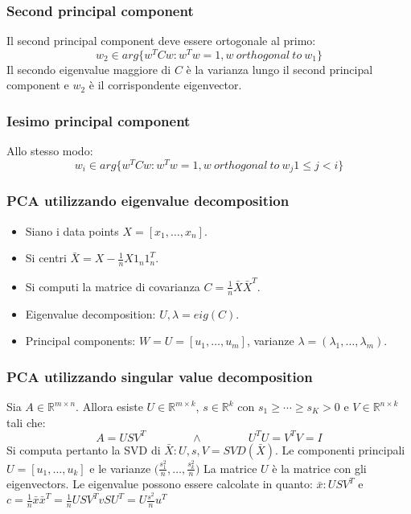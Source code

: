 		\subsubsection{Second principal component}
		Il second principal component deve essere ortogonale al primo:
		$$w_2\in arg\{w^TCw:w^Tw=1,w\ orthogonal\ to\ w_1\}$$
		Il secondo eigenvalue maggiore di $C$ \`e la varianza lungo il second principal component e $w_2$ \`e il corrispondente eigenvector.

		\subsubsection{Iesimo principal component}
		Allo stesso modo:
		$$w_i\in arg\{w^TCw:w^Tw=1,w\ orthogonal\ to\ w_j 1\le j < i\}$$

		\subsubsection{PCA utilizzando eigenvalue decomposition}
		\begin{itemize}
			\item Siano i data points $X=[x_1,\dots,x_n]$.
			\item Si centri $\bar{X} = X-\frac{1}{n}X1_n1_n^T$.
			\item Si computi la matrice di covarianza $C=\frac{1}{n}\bar{X}\bar{X}^T$.
			\item Eigenvalue decomposition: $U,\lambda = eig(C)$.
			\item Principal components: $W=U=[u_1,\dots,u_m]$, varianze $\lambda = (\lambda_1,\dots,\lambda_m)$.
		\end{itemize}

		\subsubsection{PCA utilizzando singular value decomposition}
		Sia $A\in\mathbb{R}^{m\times n}$.
		Allora esiste $U\in\mathbb{R}^{m\times k}$, $s\in\mathbb{R}^k$ con $s_1\ge\cdots\ge s_K >0$ e $V\in \mathbb{R}^{n\times k}$ tali che:
		$$A = USV^T\qquad\qquad\land\qquad\qquad U^TU=V^TV=I$$
		Si computa pertanto la SVD di $\bar{X}:U,s,V=SVD(\bar{X})$.
		Le componenti principali $U=[u_1,\dots,u_k]$ e le varianze $\bigl(\frac{s_1^2}{n},\dots,\frac{s_k^2}{n}\bigr)$
		La matrice $U$ \`e la matrice con gli eigenvectors.
		Le eigenvalue possono essere calcolate in quanto: $\bar{x} : USV^T$ e $c = \frac{1}{n}\bar{x}\bar{x}^T = \frac{1}{n}USV^TvSU^T=U\frac{s^2}{n}u^T$

